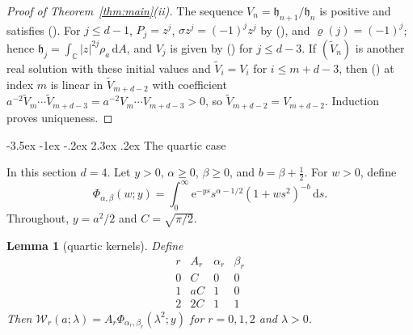 \documentclass[twoside,10pt]{article}
\makeatletter
\numberwithin{equation}{section}
\theoremstyle{slbody}
\newtheorem{lemma}[theorem]{Lemma}
\theoremstyle{remark}
\newcommand{\C}{\mathbb C}
\newcommand{\dd}{\,\mathrm d}
\newcommand{\e}{\mathrm e}
\newcommand{\fh}{\mathfrak h}
\renewcommand{\section}{%
  \@startsection{section}{1}{\z@}%
    {-3.5ex \@plus -1ex \@minus -.2ex}%
    {2.3ex \@plus .2ex}%
    {\normalfont\large\bfseries}}
\renewcommand{\eqref}[1]{%
  \textup{{\normalfont(\oldstylenums{\ref{#1}}}\normalfont)}}
\makeatother
\begin{document}
\begin{proof}[Proof of Theorem~\ref{thm:main}(ii)]
The sequence \(V_n=\fh_{n+1}/\fh_n\) is positive and satisfies
\eqref{eq:FH-recurrence}.  For \(j\leq d-1\), \(P_j=z^j\),
\(\sigma z^j=(-1)^jz^j\) by \eqref{eq:twist-sign}, and
\(\varrho(j)=(-1)^j\); hence \(\fh_j=\int_\C|z|^{2j}\rho_a\dd A\), and
\(V_j\) is given by \eqref{eq:FH-initial} for \(j\leq d-3\).  If
\((\widetilde V_n)\) is another real solution with these initial values
and \(\widetilde V_i=V_i\) for \(i\leq m+d-3\), then
\eqref{eq:FH-recurrence} at index \(m\) is linear in
\(\widetilde V_{m+d-2}\) with coefficient
\(a^{-2}\widetilde V_m\cdots\widetilde V_{m+d-3}=a^{-2}V_m\cdots V_{m+d-3}>0\),
so \(\widetilde V_{m+d-2}=V_{m+d-2}\).  Induction proves uniqueness.
\end{proof}

\section{The quartic case}\label{sec:quartic}

In this section \(d=4\).  Let \(y>0\), \(\alpha\geq0\), \(\beta\geq0\),
and \(b=\beta+\frac12\).  For \(w>0\), define
\begin{equation}
\Phi_{\alpha,\beta}(w;y)
=\int_0^\infty
\e^{-ys}s^{\alpha-1/2}(1+ws^2)^{-b}\dd s .
\label{eq:Phi}
\end{equation}
Throughout, \(y=a^2/2\) and \(C=\sqrt{\pi/2}\).

\begin{lemma}[quartic kernels]\label{lem:quartic-kernels}
Define
\begin{equation}
\begin{array}{c|c|c|c}
r&A_r&\alpha_r&\beta_r\\ \hline
0&C&0&0\\
1&aC&1&0\\
2&2C&1&1
\end{array}
\label{eq:block-parameters}
\end{equation}
Then \(\mathcal W_r(a;\lambda)=A_r\Phi_{\alpha_r,\beta_r}(\lambda^2;y)\)
for \(r=0,1,2\) and \(\lambda>0\).
\end{lemma}
\end{document}
